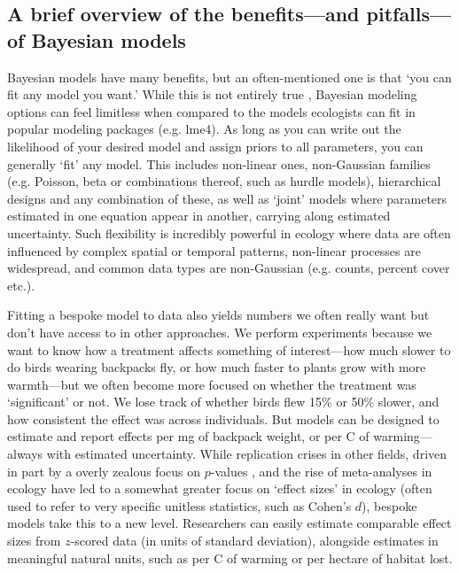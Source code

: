 \documentclass[11pt]{article}
\begin{document}
{\subsection{A brief overview of the benefits---and pitfalls---of Bayesian models} 

Bayesian models have many benefits, but an often-mentioned one is that `you can fit any model you want.' While this is not entirely true \citep{BDA,reid2019}, Bayesian modeling options can feel limitless when compared to the models ecologists can fit in popular modeling packages (e.g. \textsf{lme4}). As long as you can write out the likelihood of your desired model and assign priors to all parameters, you can generally `fit' any model. This includes non-linear ones, non-Gaussian families (e.g. Poisson, beta or combinations thereof, such as hurdle models), hierarchical designs and any combination of these, as well as `joint' models where parameters estimated in one equation appear in another, carrying along estimated uncertainty. Such flexibility is incredibly powerful in ecology where data are often influenced by complex spatial or temporal patterns, non-linear processes are widespread, and common data types are non-Gaussian (e.g. counts, percent cover etc.). 

Fitting a bespoke model to data also yields numbers we often really want but don't have access to in other approaches. We perform experiments because we want to know how a treatment affects something of interest---how much slower to do birds wearing backpacks fly, or how much faster to plants grow with more warmth---but we often become more focused on whether the treatment was `significant' or not. We lose track of whether birds flew 15\% or 50\% slower, and how consistent the effect was across individuals. But models can be designed to estimate and report effects per mg of backpack weight, or per \degree C of warming---always with estimated uncertainty. While replication crises in other fields, driven in part by a overly zealous focus on $p$-values \citep{halsey2015,loken2017}, and the rise of meta-analyses in ecology \citep{Hampton2013} have led to a somewhat greater focus on `effect sizes' in ecology (often used to refer to very specific unitless statistics, such as Cohen's $d$), bespoke models take this to a new level. Researchers can easily estimate comparable effect sizes from $z$-scored data (in units of standard deviation), alongside estimates in meaningful natural units, such as per \degree C of warming or per hectare of habitat lost.

}
\end{document}
